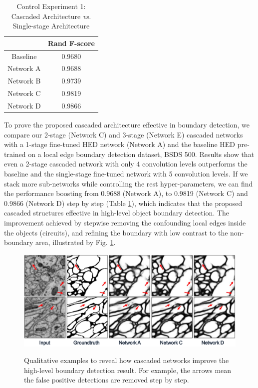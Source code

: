 \documentclass[senior]{IPSstyle}
\begin{document}
\begin{table}[t]
\renewcommand{\arraystretch}{0.6}
\caption{Control Experiment 1: Cascaded Architecture \emph{vs.} Single-stage Architecture}
\label{outcome}
\begin{center}
\begin{tabular}{|c|c|}
\hline
&\multicolumn{1}{c|}{Rand F-score}\\
\hline
Baseline 			& 0.9680	\\	\hline
Network A 		& 0.9688 	\\	\hline
Network B			& 0.9739	 \\	\hline
Network C 		& 0.9819	\\	\hline
Network D 		& 0.9866	\\	\hline
\end{tabular}
\end{center}
\label{control experiment 1}
\end{table}

To prove the proposed cascaded architecture effective in boundary detection, we compare our 2-stage (Network C) and 3-stage (Network E) cascaded networks with a 1-stage fine-tuned HED\cite{Xie2015} network (Network A) and the baseline HED\cite{Xie2015} pre-trained on a local edge boundary detection dataset, BSDS 500\cite{Arbelaez2011}. Results show that even a 2-stage cascaded network with only 4 convolution levels outperforms the baseline and the single-stage fine-tuned network with 5 convolution levels. If we stack more sub-networks while controlling the rest hyper-parameters, we can find the performance boosting from 0.9688 (Network A), to 0.9819 (Network C) and 0.9866 (Network D) step by step (Table \ref{control experiment 1}), which indicates that the proposed cascaded structures effective in high-level object boundary detection. The improvement achieved by stepwise removing the confounding local edges inside the objects (circuits), and refining the boundary with low contrast to the non-boundary area, illustrated by Fig. \ref{control 1}.

\begin{figure}[t]
  \centering
  \includegraphics[width=15cm]{control_1.png}\\
  \caption{Qualitative examples to reveal how cascaded networks improve the high-level boundary detection result. For example, the arrows mean the false positive detections are removed step by step.}\label{control 1}
\end{figure}
\end{document}

